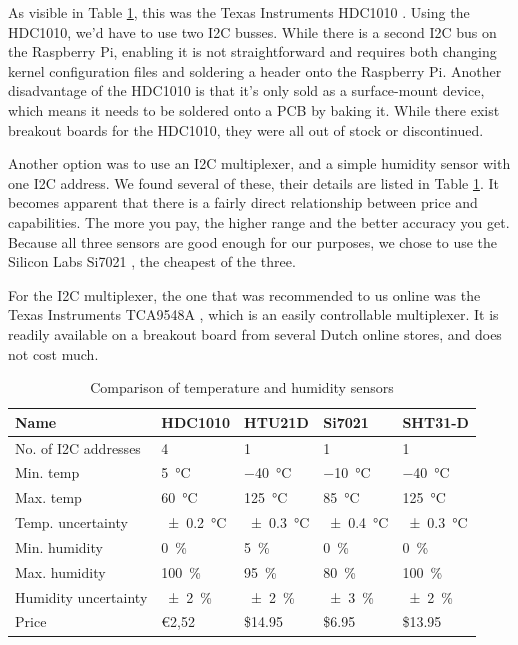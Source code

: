 \documentclass[a4paper,oneside]{book}
\begin{document}
As visible in Table \ref{tab:humidity}, this was the Texas Instruments HDC1010
\cite{HDC1010}. Using the HDC1010, we'd have to use two I2C busses. While there
is a second I2C bus on the Raspberry Pi, enabling it is not straightforward and
requires both changing kernel configuration files and soldering a header onto
the Raspberry Pi. Another disadvantage of the HDC1010 is that it's only sold as
a surface-mount device, which means it needs to be soldered onto a PCB by
baking it. While there exist breakout boards for the HDC1010, they were all out
of stock or discontinued.

Another option was to use an I2C multiplexer, and a simple humidity sensor with
one I2C address. We found several of these, their details are listed in Table
\ref{tab:humidity}. It becomes apparent that there is a fairly direct
relationship between price and capabilities. The more you pay, the higher range
and the better accuracy you get. Because all three sensors are good enough for
our purposes, we chose to use the Silicon Labs Si7021 \cite{Si7021}, the
cheapest of the three.

For the I2C multiplexer, the one that was recommended to us online was the
Texas Instruments TCA9548A \cite{TCA9548A}, which is an easily controllable
multiplexer. It is readily available on a breakout board from several Dutch
online stores, and does not cost much.

\begin{table}[!htb]
\centering
\begin{tabular}{lllll}
Name                 & HDC1010                & HTU21D                 & Si7021                & SHT31-D                \\ \hline
No. of I2C addresses & 4                      & 1                      & 1                     & 1                      \\
Min. temp            & \SI{5}{\celsius}       & \SI{-40}{\celsius}     & \SI{-10}{\celsius}    & \SI{-40}{\celsius}     \\
Max. temp            & \SI{60}{\celsius}      & \SI{125}{\celsius}     & \SI{85}{\celsius}     & \SI{125}{\celsius}     \\
Temp. uncertainty    & \SI{\pm0.2}{\celsius}  & \SI{\pm0.3}{\celsius}  & \SI{\pm0.4}{\celsius} & \SI{\pm0.3}{\celsius}  \\
Min. humidity        & \SI{0}{\percent}       & \SI{5}{\percent}       & \SI{0}{\percent}      & \SI{0}{\percent}       \\
Max. humidity        & \SI{100}{\percent}     & \SI{95}{\percent}      & \SI{80}{\percent}     & \SI{100}{\percent}     \\
Humidity uncertainty & \SI{\pm2}{\percent}    & \SI{\pm2}{\percent}    & \SI{\pm3}{\percent}   & \SI{\pm2}{\percent}    \\
Price                & \euro 2,52             & \$14.95                & \$6.95                & \$13.95
\end{tabular}
\caption{Comparison of temperature and humidity sensors \protect\cite{HDC1010}
\protect\cite{HTU21D} \protect\cite{Si7021} \protect\cite{SHT31-D}}
\label{tab:humidity}
\end{table}
\end{document}
